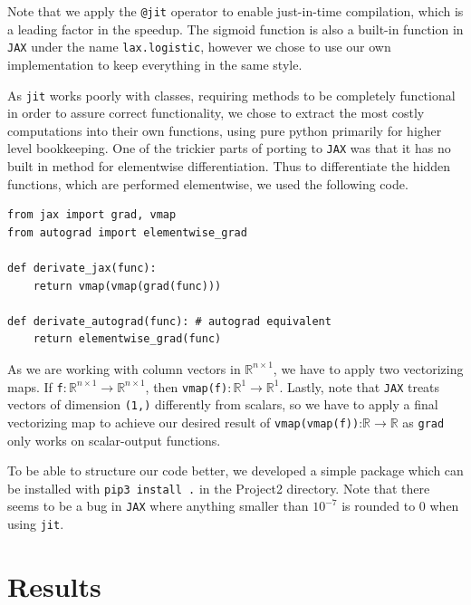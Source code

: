 \documentclass{article}
\theoremstyle{definition}
\begin{document}
Note that we apply the \verb|@jit| operator to enable just-in-time compilation, which is a leading factor in the speedup. The sigmoid function is also a built-in function in \verb|JAX| under the name \verb|lax.logistic|, however we chose to use our own implementation to keep everything in the same style.

As \verb|jit| works poorly with classes, requiring methods to be completely functional in order to assure correct functionality, we chose to extract the most costly computations into their own functions, using pure python primarily for higher level bookkeeping. One of the trickier parts of porting to \verb|JAX| was that it has no built in method for elementwise differentiation. Thus to differentiate the hidden functions, which are performed elementwise, we used the following code.

\begin{verbatim}
from jax import grad, vmap
from autograd import elementwise_grad

def derivate_jax(func):
    return vmap(vmap(grad(func)))

def derivate_autograd(func): # autograd equivalent
    return elementwise_grad(func)
\end{verbatim}

As we are working with column vectors in $\mathbb{R}^{n \times 1}$, we have to apply two vectorizing maps. If \verb|f|$: \mathbb{R}^{n \times 1} \to \mathbb{R}^{n \times 1}$, then \verb|vmap(f)|$: \mathbb{R}^{1} \to \mathbb{R}^{1}$. Lastly, note that \verb|JAX| treats vectors of dimension \verb|(1,)| differently from scalars, so we have to apply a final vectorizing map to achieve our desired result of \verb|vmap(vmap(f))|:$\mathbb{R} \to \mathbb{R}$ as \verb|grad| only works on scalar-output functions.

To be able to structure our code better, we developed a simple package which can be installed with \texttt{pip3 install .} in the Project2 directory. Note that there seems to be a bug in \verb|JAX| where anything smaller than $10^{-7}$ is rounded to $0$ when using \verb|jit|.

\newpage
\section{Results}
\end{document}
